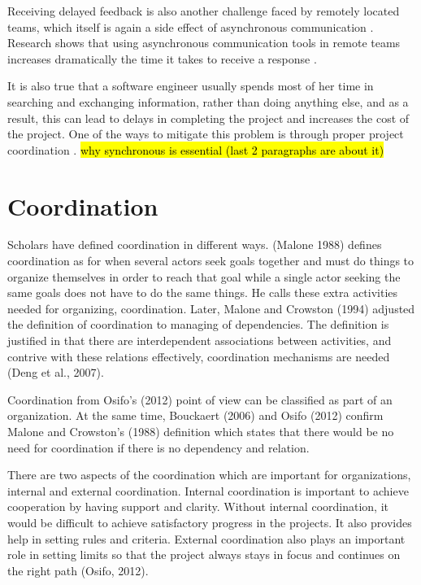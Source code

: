 Receiving delayed feedback is also another challenge faced by remotely located teams, which itself is again a side effect of asynchronous communication \citep{conchuir2006exploring,holmstrom2006agile}. Research shows that using asynchronous communication tools in remote teams increases dramatically the time it takes to receive a response \citep{holmstrom2006global}. 

It is also true that a software engineer usually spends most of her time in searching and exchanging information, rather than doing anything else, and as a result, this can lead to delays in completing the project and increases the cost of the project. One of the ways to mitigate this problem is through proper project coordination \citep{dumitriu2006issues}. \hl{why synchronous is essential (last 2 paragraphs are about it)}

\section{Coordination} \label{coord}
Scholars have defined coordination in different ways. (Malone 1988) defines coordination as for when several actors seek goals together and must do things to organize themselves in order to reach that goal while a single actor seeking the same goals does not have to do the same things. He calls these extra activities needed for organizing, coordination. Later, Malone and Crowston (1994) adjusted the definition of coordination to managing of dependencies. The definition is justified in that there are interdependent associations between activities, and contrive with these relations effectively, coordination mechanisms are needed (Deng et al., 2007).

Coordination from Osifo's (2012) point of view can be classified as part of an organization. At the same time, Bouckaert (2006) and Osifo (2012) confirm Malone and Crowston’s (1988) definition which states that there would be no need for coordination if there is no dependency and relation.

There are two aspects of the coordination which are important for organizations, internal and external coordination. Internal coordination is important to achieve cooperation by having support and clarity. Without internal coordination, it would be difficult to achieve satisfactory progress in the projects. It also provides help in setting rules and criteria. External coordination also plays an important role in setting limits so that the project always stays in focus and continues on the right path (Osifo, 2012).

